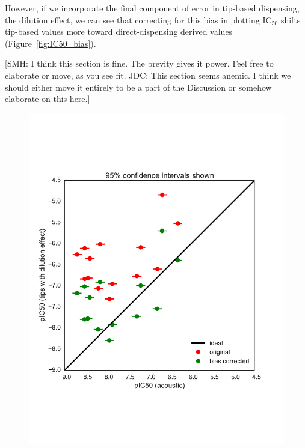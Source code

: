 \documentclass[aps,pre,twocolumn,nofootinbib,superscriptaddress,linenumbers]{revtex4-1}
\begin{document}
However, if we incorporate the final component of error in tip-based dispensing, the dilution effect, we can see that correcting for this bias in plotting IC$_{50}$ shifts tip-based values more toward direct-dispensing derived values (Figure~\ref{fig:IC50_bias}).

{\color{red}[SMH: I think this section is fine. The brevity gives it power. Feel free to elaborate or move, as you see fit. JDC: This section seems anemic. I think we should either move it entirely to be a part of the Discussion or somehow elaborate on this here.]}

\begin{figure}[tb]
    \includegraphics[width=\columnwidth]{../figures/compare-pIC50-bias_corrected.pdf}


\end{figure}
\end{document}
